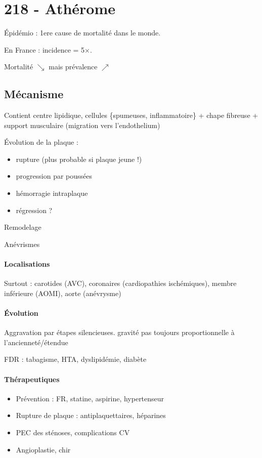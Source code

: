 \def\arrow{$\rightarrow$}


\section{218 - Athérome}%
\label{sec:1_atherome}

Épidémio : 1ere cause de mortalité dans le monde. 

En France : incidence \male = 5$\times$\female. 

Mortalité $\searrow$ mais prévalence $\nearrow$

\subsection{Mécanisme}
Contient centre lipidique, cellules \{spumeuses, inflammatoire\} +
chape fibreuse + support musculaire (migration vers l'endothelium)

Évolution de la plaque :
\begin{itemize}
  \item rupture (plus probable si plaque jeune !)
  \item progression par poussées
  \item hémorragie intraplaque
  \item régression ?
\end{itemize}
Remodelage

Anévrismes

\paragraph{Localisations}
Surtout : carotides (AVC), coronaires (cardiopathies ischémiques), membre inférieure
(AOMI), aorte (anévrysme)

\paragraph{Évolution} Aggravation par étapes silencieuses. \danger gravité pas
toujours proportionnelle à l'ancienneté/étendue

FDR : tabagisme, HTA, dyslipidémie, diabète

\paragraph{Thérapeutiques}
\begin{itemize}
\item Prévention : FR, statine, aspirine, hypertenseur
\item Rupture de plaque : antiplaquettaires, héparines
\item PEC des sténoses, complications CV
\item Angioplastie, chir
\end{itemize}
